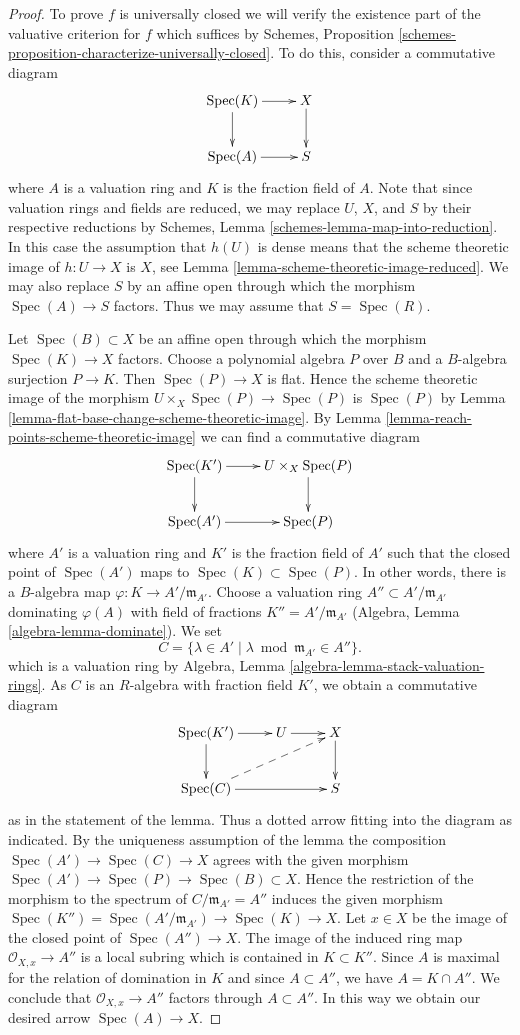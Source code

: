 \documentclass[10pt,a4paper]{amsart}
\theoremstyle{plain}
\theoremstyle{definition}
\theoremstyle{remark}
\numberwithin{equation}{subsection}
\def\Spec{\mathop{\mathrm{Spec}}}
\begin{document}
\begin{proof}
To prove $f$ is universally closed we will verify the existence part of the
valuative criterion for $f$ which suffices by
Schemes, Proposition \ref{schemes-proposition-characterize-universally-closed}.
To do this, consider a commutative diagram
$$
\xymatrix{
\Spec(K) \ar[r] \ar[d] & X \ar[d] \\
\Spec(A) \ar[r] & S
}
$$
where $A$ is a valuation ring and $K$ is the fraction field of $A$.
Note that since valuation rings and fields are reduced, we may
replace $U$, $X$, and $S$ by their respective reductions
by Schemes, Lemma \ref{schemes-lemma-map-into-reduction}.
In this case the assumption that $h(U)$ is dense means that
the scheme theoretic image of $h : U \to X$ is $X$, see
Lemma \ref{lemma-scheme-theoretic-image-reduced}.
We may also replace $S$ by an affine open through which
the morphism $\Spec(A) \to S$ factors. Thus we may
assume that $S = \Spec(R)$.

\medskip\noindent
Let $\Spec(B) \subset X$ be an affine open through which
the morphism $\Spec(K) \to X$ factors. Choose a polynomial
algebra $P$ over $B$ and a $B$-algebra surjection $P \to K$.
Then $\Spec(P) \to X$ is flat. Hence the scheme theoretic image
of the morphism $U \times_X \Spec(P) \to \Spec(P)$ is $\Spec(P)$ by
Lemma \ref{lemma-flat-base-change-scheme-theoretic-image}.
By Lemma \ref{lemma-reach-points-scheme-theoretic-image}
we can find a commutative diagram
$$
\xymatrix{
\Spec(K') \ar[r] \ar[d] & U \times_X \Spec(P) \ar[d] \\
\Spec(A') \ar[r] & \Spec(P)
}
$$
where $A'$ is a valuation ring and $K'$ is the fraction field of $A'$
such that the closed point of $\Spec(A')$ maps to $\Spec(K) \subset \Spec(P)$.
In other words, there is a $B$-algebra map
$\varphi : K \to A'/\mathfrak m_{A'}$. Choose a valuation ring
$A'' \subset A'/\mathfrak m_{A'}$ dominating $\varphi(A)$ with
field of fractions $K'' = A'/\mathfrak m_{A'}$
(Algebra, Lemma \ref{algebra-lemma-dominate}). We set
$$
C = \{\lambda \in A' \mid \lambda \bmod \mathfrak m_{A'} \in A''\}.
$$
which is a valuation ring by
Algebra, Lemma \ref{algebra-lemma-stack-valuation-rings}.
As $C$ is an $R$-algebra with fraction field $K'$, we obtain a
commutative diagram
$$
\xymatrix{
\Spec(K') \ar[r] \ar[d] & U \ar[r] & X \ar[d] \\
\Spec(C) \ar[rr] \ar@{-->}[rru] & & S
}
$$
as in the statement of the lemma. Thus a dotted arrow fitting into
the diagram as indicated. By the uniqueness assumption of the lemma
the composition $\Spec(A') \to \Spec(C) \to X$ agrees with the
given morphism $\Spec(A') \to \Spec(P) \to \Spec(B) \subset X$.
Hence the restriction of the morphism to the spectrum of
$C/\mathfrak m_{A'} = A''$ induces the given morphism
$\Spec(K'') = \Spec(A'/\mathfrak m_{A'}) \to \Spec(K) \to X$.
Let $x \in X$ be the image of the closed point of $\Spec(A'') \to X$.
The image of the induced ring map $\mathcal{O}_{X, x} \to A''$
is a local subring which is contained in $K \subset K''$.
Since $A$ is maximal for the relation of domination in $K$
and since $A \subset A''$, we have $A = K \cap A''$. We conclude
that $\mathcal{O}_{X, x} \to A''$ factors through $A \subset A''$.
In this way we obtain our desired arrow $\Spec(A) \to X$.


\end{proof}
\end{document}

